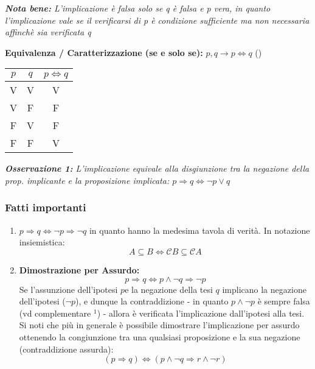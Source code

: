 \documentclass[10pt]{article}
\theoremstyle{plain}
\begin{document}
\begin{description}
\begin{center}
\begin{tabular}{c|c|c}
         \end{tabular}  \end{center}
    \item \textit{\textbf{Nota bene:} L'implicazione è falsa solo se q è falsa e p vera, in quanto l'implicazione vale se il verificarsi di p è condizione sufficiente ma non necessaria affinchè sia verificata q}
 \item[$\ast$] \textbf{Equivalenza / Caratterizzazione (se e solo se):} $p, q \longrightarrow p \Leftrightarrow q$ (\*)
   \item \begin{center} \begin{tabular}{c|c|c}
        $p$ & $q$ & $p \Leftrightarrow q$  \\
        \hline  V  & V & V \\ V & F & F \\ F & V & F \\ F & F & V 
       \end{tabular}  \end{center}
    \item \textit{\textbf{Osservazione 1:} L'implicazione equivale alla disgiunzione tra la negazione della prop. implicante e la proposizione implicata: $p \Rightarrow q \Longleftrightarrow \neg p \lor q$}
\end{description}
\subsubsection*{Fatti importanti}
\begin{enumerate}
    \item $p \Rightarrow q \Longleftrightarrow \neg p \Rightarrow \neg q$ in quanto hanno la medesima tavola di verità\*. In notazione insiemistica: \[A \subseteq B \Longleftrightarrow \mathcal{C}B \subseteq \mathcal{C}A\]
    \item \textbf{Dimostrazione per Assurdo:} \[p \Rightarrow q \Longleftrightarrow p \land \neg q \Rightarrow \neg p\] Se l'assunzione dell'ipotesi $p $e la negazione della tesi $q$ implicano la negazione dell'ipotesi ($\neg p$), e dunque la contraddizione - in quanto $p \land \neg p$ è sempre falsa (vd complementare \hyperlink{nullo}{$^1$}) - allora è verificata l'implicazione dall'ipotesi alla tesi. Si noti che più in generale è possibile dimostrare l'implicazione per assurdo ottenendo la congiunzione tra una qualsiasi proposizione e la sua negazione (contraddizione assurda): \[(p \Rightarrow q) \Longleftrightarrow (p \land \neg q \Rightarrow r \land \neg r)\]
\end{enumerate}
\end{document}
